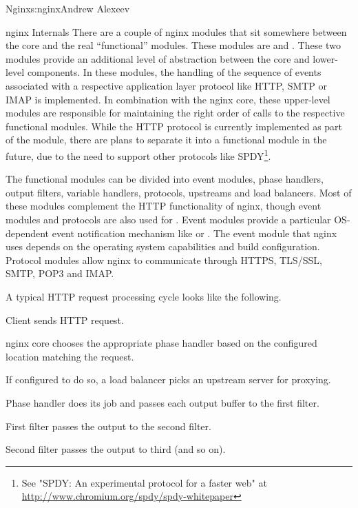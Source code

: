 \begin{aosachapter}{Nginx}{s:nginx}{Andrew Alexeev}
\begin{aosasect1}{nginx Internals}
There are a couple of nginx modules that sit somewhere between the
core and the real ``functional'' modules. These modules are
 and . These two modules provide an additional
level of abstraction between the core and lower-level components. In
these modules, the handling of the sequence of events associated with
a respective application layer protocol like HTTP, SMTP or IMAP is
implemented. In combination with the nginx core, these upper-level
modules are responsible for maintaining the right order of calls to
the respective functional modules. While the HTTP protocol is
currently implemented as part of the  module, there are plans
to separate it into a functional module in the future, due to 
the need to support other protocols like SPDY\footnote{See "SPDY: An experimental protocol for a faster web" at \url{http://www.chromium.org/spdy/spdy-whitepaper}}.

The functional modules can be divided into event modules, phase
handlers, output filters, variable handlers, protocols, upstreams and
load balancers. Most of these modules complement the HTTP
functionality of nginx, though event modules and protocols are also
used for . Event modules provide a particular OS-dependent
event notification mechanism like  or .  The
event module that nginx uses depends on the operating system
capabilities and build configuration. Protocol modules allow nginx to
communicate through HTTPS, TLS/SSL, SMTP, POP3 and IMAP.

A typical HTTP request processing cycle looks like the following.

\begin{aosaenumerate}

\item Client sends HTTP request.

\item nginx core chooses the appropriate phase handler based on the
  configured location matching the request.

\item If configured to do so, a load balancer picks an upstream server
  for proxying.

\item Phase handler does its job and passes each output buffer to the first
  filter.

\item First filter passes the output to the second filter.

\item Second filter passes the output to third (and so on).


\end{aosaenumerate}
\end{aosasect1}
\end{aosachapter}

